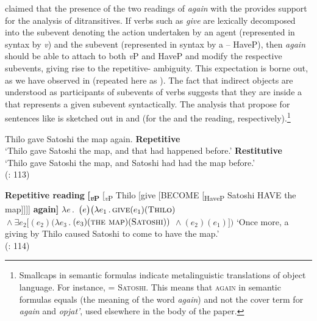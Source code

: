 \documentclass[output=paper]{langscibook}
\begin{document}
\citet{Beck-Johnson2004} claimed that the presence of the two readings of \textit{again} with the  provides support for the  analysis of  ditransitives. If  verbs such as \textit{give} are lexically decomposed into the subevent denoting the action undertaken by an agent (represented in syntax by \textit{v}) and the  subevent (represented in syntax by a  – HaveP), then \textit{again} should be able to attach to both \textit{v}P and HaveP and modify the respective subevents, giving rise to the repetitive- ambiguity. This expectation is borne out, as we have observed in  (repeated here as ). The fact that indirect objects are understood as participants of  subevents of  verbs suggests that they are inside a  that represents a given  subevent syntactically. The analysis that \citet{Beck-Johnson2004} propose for sentences like  is sketched out in  and  (for the  and the  reading, respectively).\footnote{Smallcaps in semantic formulas indicate metalinguistic translations of object language. For instance,  = \textsc{Satoshi}. This means that \textsc{again} in semantic formulas equals  (the meaning of the word \textit{again}) and not the cover term for  \textit{again} and  \textit{opjat'}, used elsewhere in the body of the paper.}


 \ea\label{ex:bondarenko:9}{Thilo gave Satoshi the map again.}
\ea \textbf{Repetitive}\\`Thilo gave Satoshi the map, and that had happened before.'
\ex \textbf{Restitutive}\\`Thilo gave Satoshi the map, and Satoshi had had the map before.'\\
\hfill(\citealt{Beck-Johnson2004}: 113)
\z
\z

\ea\label{ex:bondarenko:10}\textbf{Repetitive reading}
\ea \textbf{[\textit{\textsubscript{v}}}\textbf{\textsubscript{P}}\textsubscript{}  [\textit{\textsubscript{v}}\textsubscript{P} Thilo [give [BECOME [\textsubscript{HaveP} Satoshi HAVE the map]]]] \textbf{again]}
\ex $\lambda e\,.\;$$\,\big(e\big)\big(\lambda e_1\,.\,\textsc{give}(e_1)(\textsc{Thilo})$\\
\tabto{1cm}${}\wedge\exists e_2[$$(e_2)(\lambda e_3\,.\,$$(e_3)(\textsc{the map})(\textsc{Satoshi}))$
\tabto{1cm}${}\wedge{}$$(e_2)(e_1)]\big)$
\ex     `Once more, a giving by Thilo caused Satoshi to come to have   the map.'\\
\hfill(\citealt{Beck-Johnson2004}: 114)
\z
\z
\end{document}
